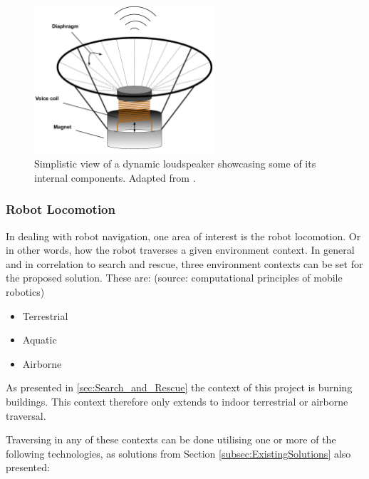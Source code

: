 \begin{figure}[H]
    \centering
    \includegraphics[width=0.6\textwidth]{figures/1Problem_analysis/loudspeaker.pdf}
    \caption{Simplistic view of a dynamic loudspeaker showcasing some of its internal components. Adapted from \cite{Acoustics:Audio_production}.}
    \label{fig:Loudspeaker}
\end{figure}



\subsubsection{Robot Locomotion}\label{subsubsec:RobootLocomotion}
In dealing with robot navigation, one area of interest is the robot locomotion. Or in other words, how the robot traverses a given environment context. In general and in correlation to search and rescue, three environment contexts can be set for the proposed solution. These are: 
(source: computational principles of mobile robotics)

\begin{multicols}{3}
    \begin{itemize}
        \Centering
        \item Terrestrial
        \item Aquatic
        \item Airborne
    \end{itemize}
\end{multicols}

As presented in \ref{sec:Search_and_Rescue} the context of this project is burning buildings. This context therefore only extends to indoor terrestrial or airborne traversal. 

Traversing in any of these contexts can be done utilising one or more of the following technologies, as solutions from Section \ref{subsec:ExistingSolutions} also presented:

